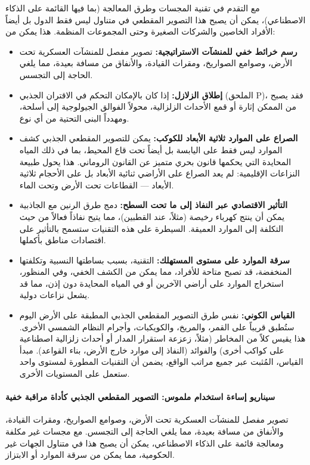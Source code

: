 \documentclass[12pt,a4paper]{article}
\theoremstyle{remark}
\begin{document}
	مع التقدم في تقنية المجسات وطرق المعالجة (بما فيها القائمة على الذكاء الاصطناعي)، يمكن أن يصبح هذا التصوير المقطعي في متناول ليس فقط الدول بل أيضاً الأفراد الخاصين والشركات الصغيرة وحتى المجموعات المنظمة. هذا يمكن من:
	\begin{itemize}[leftmargin=*]
		\item \textbf{رسم خرائط خفي للمنشآت الاستراتيجية:} تصوير مفصل للمنشآت العسكرية تحت الأرض، وصوامع الصواريخ، ومقرات القيادة، والأنفاق من مسافة بعيدة، مما يلغي الحاجة إلى التجسس.
		\item \textbf{إطلاق الزلازل:} إذا كان بالإمكان التحكم في الاقتران الجذبي (الملحق P)، فقد يصبح من الممكن إثارة أو قمع الأحداث الزلزالية، محولاً الفوالق الجيولوجية إلى أسلحة، ومهدداً البنى التحتية من أي نوع.
		\item \textbf{الصراع على الموارد ثلاثية الأبعاد للكوكب:} يمكن للتصوير المقطعي الجذبي كشف الموارد ليس فقط على اليابسة بل أيضاً تحت قاع المحيط، بما في ذلك المياه المحايدة التي يحكمها قانون بحري متميز عن القانون الروماني. هذا يحول طبيعة النزاعات الإقليمية: لم يعد الصراع على الأراضي ثنائية الأبعاد بل على الأحجام ثلاثية الأبعاد — القطاعات تحت الأرض وتحت الماء.
		\item \textbf{التأثير الاقتصادي عبر النفاذ إلى ما تحت السطح:} دمج طرق الرنين مع الجاذبية يمكن أن ينتج كهرباء رخيصة (مثلاً، عند القطبين)، مما يتيح نفاذاً فعالاً من حيث التكلفة إلى الموارد العميقة. السيطرة على هذه التقنيات ستسمح بالتأثير على اقتصادات مناطق بأكملها.
		\item \textbf{سرقة الموارد على مستوى المستهلك:} التقنية، بسبب بساطتها النسبية وتكلفتها المنخفضة، قد تصبح متاحة للأفراد، مما يمكن من الكشف الخفي، وفي المنظور، استخراج الموارد على أراضي الآخرين أو في المياه المحايدة دون إذن، مما قد يشعل نزاعات دولية.
		\item \textbf{القياس الكوني:} نفس طرق التصوير المقطعي الجذبي المطبقة على الأرض اليوم ستُطبق قريباً على القمر، والمريخ، والكويكبات، وأجرام النظام الشمسي الأخرى. هذا يقيس كلاً من المخاطر (مثلاً، زعزعة استقرار المدار أو أحداث زلزالية اصطناعية على كواكب أخرى) والفوائد (النفاذ إلى موارد خارج الأرض، بناء القواعد). مبدأ القياس، المُثبت عبر جميع مراتب الواقع، يضمن أن التقنيات المطورة لمستوى واحد ستعمل على المستويات الأخرى.
	\end{itemize}
	
	\paragraph{سيناريو إساءة استخدام ملموس: التصوير المقطعي الجذبي كأداة مراقبة خفية}
	تصوير مفصل للمنشآت العسكرية تحت الأرض، وصوامع الصواريخ، ومقرات القيادة، والأنفاق من مسافة بعيدة، مما يلغي الحاجة إلى التجسس. مع مجسات غير مكلفة ومعالجة قائمة على الذكاء الاصطناعي، يمكن أن يصبح هذا في متناول الجهات غير الحكومية، مما يمكن من سرقة الموارد أو الابتزاز.
	
\end{document}
